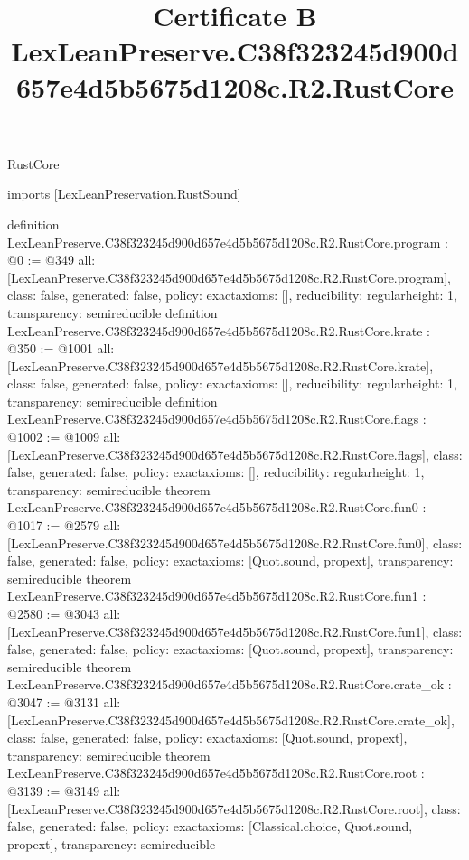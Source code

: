 \begin{lexlean}{RustCore}
\title{Certificate B LexLeanPreserve.C38f323245d900d657e4d5b5675d1208c.R2.RustCore}
\begin{coremodule}
imports [LexLeanPreservation.RustSound]

definition LexLeanPreserve.C38f323245d900d657e4d5b5675d1208c.R2.RustCore.program : @0 := @349 {
  all: [LexLeanPreserve.C38f323245d900d657e4d5b5675d1208c.R2.RustCore.program],
  class: false,
  generated: false,
  policy: exact{axioms: []},
  reducibility: regular{height: 1},
  transparency: semireducible
}
definition LexLeanPreserve.C38f323245d900d657e4d5b5675d1208c.R2.RustCore.krate : @350 := @1001 {
  all: [LexLeanPreserve.C38f323245d900d657e4d5b5675d1208c.R2.RustCore.krate],
  class: false,
  generated: false,
  policy: exact{axioms: []},
  reducibility: regular{height: 1},
  transparency: semireducible
}
definition LexLeanPreserve.C38f323245d900d657e4d5b5675d1208c.R2.RustCore.flags : @1002 := @1009 {
  all: [LexLeanPreserve.C38f323245d900d657e4d5b5675d1208c.R2.RustCore.flags],
  class: false,
  generated: false,
  policy: exact{axioms: []},
  reducibility: regular{height: 1},
  transparency: semireducible
}
theorem LexLeanPreserve.C38f323245d900d657e4d5b5675d1208c.R2.RustCore.fun0 : @1017 := @2579 {
  all: [LexLeanPreserve.C38f323245d900d657e4d5b5675d1208c.R2.RustCore.fun0],
  class: false,
  generated: false,
  policy: exact{axioms: [Quot.sound, propext]},
  transparency: semireducible
}
theorem LexLeanPreserve.C38f323245d900d657e4d5b5675d1208c.R2.RustCore.fun1 : @2580 := @3043 {
  all: [LexLeanPreserve.C38f323245d900d657e4d5b5675d1208c.R2.RustCore.fun1],
  class: false,
  generated: false,
  policy: exact{axioms: [Quot.sound, propext]},
  transparency: semireducible
}
theorem LexLeanPreserve.C38f323245d900d657e4d5b5675d1208c.R2.RustCore.crate_ok : @3047 := @3131 {
  all: [LexLeanPreserve.C38f323245d900d657e4d5b5675d1208c.R2.RustCore.crate_ok],
  class: false,
  generated: false,
  policy: exact{axioms: [Quot.sound, propext]},
  transparency: semireducible
}
theorem LexLeanPreserve.C38f323245d900d657e4d5b5675d1208c.R2.RustCore.root : @3139 := @3149 {
  all: [LexLeanPreserve.C38f323245d900d657e4d5b5675d1208c.R2.RustCore.root],
  class: false,
  generated: false,
  policy: exact{axioms: [Classical.choice, Quot.sound, propext]},
  transparency: semireducible
}


\end{coremodule}
\end{lexlean}
